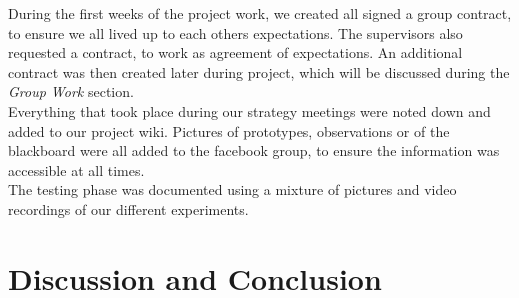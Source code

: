 During the first weeks of the project work, we created all signed a group contract, to ensure we all lived up to each others expectations. The supervisors also requested a contract, to work as agreement of expectations. An additional contract was then created later during project, which will be discussed during the \textit{Group Work} section.\\
Everything that took place during our strategy meetings were noted down and added to our project wiki. Pictures of prototypes, observations or of the blackboard were all added to the facebook group, to ensure the information was accessible at all times.\\
The testing phase was documented using a mixture of  pictures and video recordings of our different experiments.

\section{Discussion and Conclusion}
